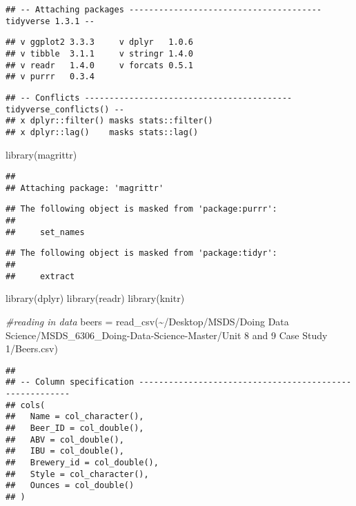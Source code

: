 \documentclass[
]{article}
\newenvironment{Shaded}{\begin{snugshade}}{\end{snugshade}}
\newcommand{\CommentTok}[1]{\textcolor[rgb]{0.56,0.35,0.01}{\textit{#1}}}
\newcommand{\FunctionTok}[1]{\textcolor[rgb]{0.00,0.00,0.00}{#1}}
\newcommand{\NormalTok}[1]{#1}
\newcommand{\OtherTok}[1]{\textcolor[rgb]{0.56,0.35,0.01}{#1}}
\newcommand{\StringTok}[1]{\textcolor[rgb]{0.31,0.60,0.02}{#1}}
\begin{document}
\begin{verbatim}
## -- Attaching packages --------------------------------------- tidyverse 1.3.1 --
\end{verbatim}

\begin{verbatim}
## v ggplot2 3.3.3     v dplyr   1.0.6
## v tibble  3.1.1     v stringr 1.4.0
## v readr   1.4.0     v forcats 0.5.1
## v purrr   0.3.4
\end{verbatim}

\begin{verbatim}
## -- Conflicts ------------------------------------------ tidyverse_conflicts() --
## x dplyr::filter() masks stats::filter()
## x dplyr::lag()    masks stats::lag()
\end{verbatim}

\begin{Shaded}
\begin{Highlighting}[]
\FunctionTok{library}\NormalTok{(magrittr)}
\end{Highlighting}
\end{Shaded}

\begin{verbatim}
## 
## Attaching package: 'magrittr'
\end{verbatim}

\begin{verbatim}
## The following object is masked from 'package:purrr':
## 
##     set_names
\end{verbatim}

\begin{verbatim}
## The following object is masked from 'package:tidyr':
## 
##     extract
\end{verbatim}

\begin{Shaded}
\begin{Highlighting}[]
\FunctionTok{library}\NormalTok{(dplyr)}
\FunctionTok{library}\NormalTok{(readr)}
\FunctionTok{library}\NormalTok{(knitr)}

\CommentTok{\#reading in data}
\NormalTok{beers }\OtherTok{=} \FunctionTok{read\_csv}\NormalTok{(}\StringTok{\textquotesingle{}\textasciitilde{}/Desktop/MSDS/Doing Data Science/MSDS\_6306\_Doing{-}Data{-}Science{-}Master/Unit 8 and 9 Case Study 1/Beers.csv\textquotesingle{}}\NormalTok{)}
\end{Highlighting}
\end{Shaded}

\begin{verbatim}
## 
## -- Column specification --------------------------------------------------------
## cols(
##   Name = col_character(),
##   Beer_ID = col_double(),
##   ABV = col_double(),
##   IBU = col_double(),
##   Brewery_id = col_double(),
##   Style = col_character(),
##   Ounces = col_double()
## )
\end{verbatim}
\end{document}
